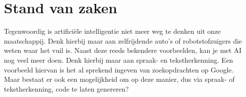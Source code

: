 \chapter{Stand van zaken}
\label{ch:stand-van-zaken}







Tegenwoordig is artificiële intelligentie niet meer weg te denken uit onze maatschappij. Denk hierbij maar aan zelfrijdende auto’s of robotstofzuigers die weten waar het vuil is. Naast deze reeds bekendere voorbeelden, kan je met AI nog veel meer doen. Denk hierbij maar aan spraak- en tekstherkenning. Een voorbeeld hiervan is het al sprekend ingeven van zoekopdrachten op Google. Maar bestaat er ook een mogelijkheid om op deze manier, dus via spraak- of tekstherkenning, code te laten genereren?

